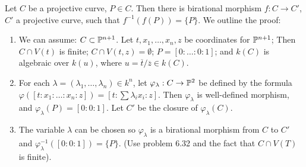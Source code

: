 \begin{prob}{6.43}
    Let \(C\) be a projective curve, \(P\in C\). Then there is birational morphism \(f:C\rightarrow C'\), \(C'\) a projective curve, such that \(f^{-1}(f(P))=\{P\}\). We outline the proof:
    \begin{enumerate}
        \item We can assume: \(C\subset\mathbb{P}^{n+1}\). Let \(t,x_1,\dots,x_n, z\) be coordinates for \(\mathbb{P}^{n+1}\); Then \(C\cap V(t)\) is finite; \(C\cap V(t,z)=\emptyset\); \(P=[0:\dots:0:1]\); and \(k(C)\) is algebraic over \(k(u)\), where \(u=\overline{t}/\overline{z}\in k(C)\).
        \item For each \(\lambda=(\lambda_1,\dots,\lambda_n)\in k^n\), let \(\varphi_\lambda:C\rightarrow\mathbb{P}^2\) be defined by the formula \(\varphi([t:x_1:\dots:x_n:z])=[t:\sum\lambda_ix_i:z]\). Then \(\varphi_\lambda\) is well-defined morphism, and \(\varphi_\lambda(P)=[0:0:1]\). Let \(C'\) be the closure of \(\varphi_\lambda(C)\).
        \item The variable \(\lambda\) can be chosen so \(\varphi_\lambda\) is a birational morphism from \(C\) to \(C'\) and \(\varphi^{-1}_\lambda([0:0:1])=\{P\}\). (Use problem 6.32 and the fact that \(C\cap V(T)\) is finite).
    \end{enumerate}
\end{prob}

\begin{sol}{6.43}

\end{sol}

